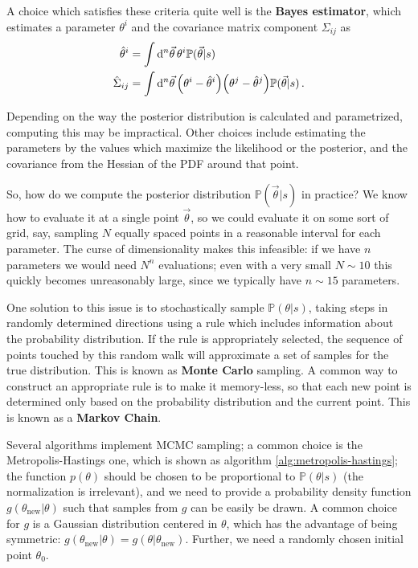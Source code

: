 \documentclass[main.tex]{subfiles}
\begin{document}
A choice which satisfies these criteria quite well is the \textbf{Bayes estimator}, which estimates a parameter \(\theta^{i}\) and the covariance matrix component \(\Sigma_{ij}\) as 
%
\begin{align}
\hat{\theta}^{i} &= \int \dd[n]{\vec{\theta} } \theta^{i}\mathbb{P}(\vec{\theta} | s)  \\
\hat{\Sigma}_{ij} &= \int \dd[n]{\vec{\theta}} 
\qty(\theta^{i}  - \hat{\theta}^{i})
\qty(\theta^{j}  - \hat{\theta}^{j}) 
\mathbb{P}(\vec{\theta} | s)
\,.
\end{align}

Depending on the way the posterior distribution is calculated and parametrized, computing this may be impractical.
Other choices include estimating the parameters by the values which maximize the likelihood or the posterior, and the covariance from the Hessian of the \ac{PDF} around that point. 

So, how do we compute the posterior distribution \(\mathbb{P}(\vec{\theta} | s)\) in practice? We know how to evaluate it at a single point \(\vec{\theta}\), so we could evaluate it on some sort of grid, say, sampling \(N\) equally spaced points in a reasonable interval for each parameter.
The curse of dimensionality makes this infeasible: if we have \(n\) parameters we would need \(N^{n}\) evaluations; even with a very small \(N \sim 10\) this quickly becomes unreasonably large, since we typically have \(n \sim 15\) parameters. 

One solution to this issue is to stochastically sample \(\mathbb{P}(\theta | s)\), taking steps in randomly determined directions using a rule which includes information about the probability distribution. 
If the rule is appropriately selected, the sequence of points touched by this random walk will approximate a set of samples for the true distribution. This is known as \textbf{Monte Carlo} sampling. 
A common way to construct an appropriate rule is to make it memory-less, so that each new point is determined only based on the probability distribution and the current point. This is known as a \textbf{Markov Chain}. 

Several algorithms implement \ac{MCMC} sampling; a common choice is the Metropolis-Hastings one, which is shown as algorithm \ref{alg:metropolis-hastings}; the function \(p(\theta )\) should be chosen to be proportional to \(\mathbb{P}(\theta | s)\) (the normalization is irrelevant), and we need to provide a probability density function \(g(\theta _{\text{new}}  | \theta  )\) such that samples from \(g\) can be easily be drawn. A common choice for \(g\) is a Gaussian distribution centered in \(\theta \), which has the advantage of being symmetric: \(g( \theta _{\text{new}}| \theta ) = g (\theta | \theta _{\text{new}})\).
Further, we need a randomly chosen initial point \(\theta_0 \).
\end{document}
